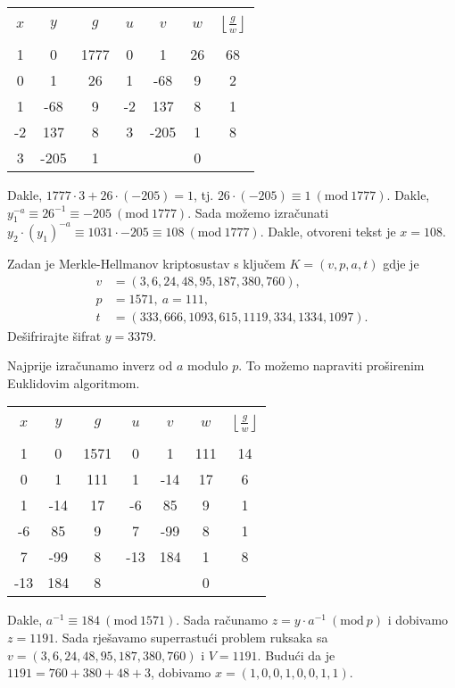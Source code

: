 \documentclass{exam}
\newcommand{\Mod}[1]{\ (\mathrm{mod}\ #1)}
\begin{document}
\begin{questions}
\begin{solution}
\begin{parts}
    \begin{tabular}{|c|c|c|c|c|c|c|}
      \hline
      & & & & & &\\[-1em]
      $x$ & $y$ & $g$ & $u$ & $v$ & $w$ & $\left\lfloor \frac{g}{w} \right\rfloor$\\
      & & & & & &\\[-1em]
      \hline
      1 & 0 & 1777 & 0 & 1 & 26 & 68\\
      0 & 1 & 26 & 1 & -68 & 9 & 2\\
      1 & -68 & 9 & -2 & 137 & 8 & 1\\
      -2 & 137 & 8 & 3 & -205 & 1 & 8\\
      3 & -205 & 1 & & & 0 &\\
      \hline
    \end{tabular}

    Dakle, $1777 \cdot 3 + 26 \cdot (-205) = 1$, tj. $26 \cdot (-205) \equiv 1 \Mod{1777}$. Dakle, $y_1^{-a} \equiv 26^{-1} \equiv -205 \Mod{1777}$. Sada možemo izračunati $y_2 \cdot (y_1)^{-a} \equiv 1031 \cdot -205 \equiv 108 \Mod{1777}$. Dakle, otvoreni tekst je $x = 108$.
  \end{parts}
\end{solution}

\question Zadan je Merkle-Hellmanov kriptosustav s ključem $K = (v, p, a, t)$ gdje je
\begin{align*}
  v &= (3, 6, 24, 48, 95, 187, 380, 760), \\
  p &= 1571, \ a = 111, \\
  t &= (333, 666, 1093, 615, 1119, 334, 1334, 1097).
\end{align*}
Dešifrirajte šifrat $y = 3379$.

\begin{solution}
  Najprije izračunamo inverz od $a$ modulo $p$. To možemo napraviti proširenim Euklidovim algoritmom.

  \begin{tabular}{|c|c|c|c|c|c|c|}
    \hline
    & & & & & &\\[-1em]
    $x$ & $y$ & $g$ & $u$ & $v$ & $w$ & $\left\lfloor \frac{g}{w} \right\rfloor$\\
    & & & & & &\\[-1em]
    \hline
    1 & 0 & 1571 & 0 & 1 & 111 & 14\\
    0 & 1 & 111 & 1 & -14 & 17 & 6\\
    1 & -14 & 17 & -6 & 85 & 9 & 1\\
    -6 & 85 & 9 & 7 & -99 & 8 & 1\\
    7 & -99 & 8 & -13 & 184 & 1 & 8\\
    -13 & 184 & 8 & & & 0 &\\
    \hline
  \end{tabular}

  Dakle, $a^{-1} \equiv 184 \Mod{1571}$. Sada računamo $z = y \cdot a^{-1} \Mod{p}$ i dobivamo $z = 1191$. Sada rješavamo superrastući problem ruksaka sa $v = (3, 6, 24, 48, 95, 187, 380, 760)$ i $V = 1191$. Budući da je $1191 = 760 + 380 + 48 + 3$, dobivamo $x = (1, 0, 0, 1, 0, 0, 1, 1)$.
\end{solution}

\end{questions}
\end{document}

